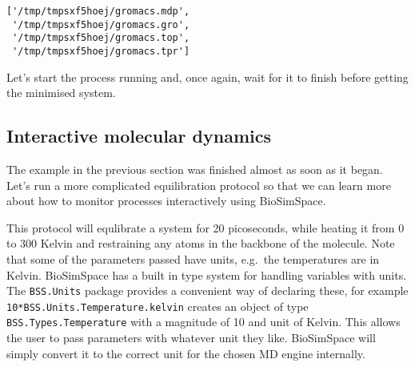 \begin{Shaded}
\begin{Highlighting}[]
\end{Highlighting}
\end{Shaded}

\begin{verbatim}
['/tmp/tmpsxf5hoej/gromacs.mdp',
 '/tmp/tmpsxf5hoej/gromacs.gro',
 '/tmp/tmpsxf5hoej/gromacs.top',
 '/tmp/tmpsxf5hoej/gromacs.tpr']
\end{verbatim}

Let's start the process running and, once again, wait for it to finish
before getting the minimised system.

\begin{Shaded}
\begin{Highlighting}[]
\OperatorTok{=}\OperatorTok{=}\NormalTok{)}
\end{Highlighting}
\end{Shaded}

\hypertarget{interactive-molecular-dynamics}{%
\subsection{Interactive molecular
dynamics}\label{interactive-molecular-dynamics}}

The example in the previous section was finished almost as soon as it
began. Let's run a more complicated equilibration protocol so that we
can learn more about how to monitor processes interactively using
BioSimSpace.

\begin{Shaded}
\begin{Highlighting}[]
\OperatorTok{=}\OperatorTok{=}\OperatorTok{*}
\OperatorTok{=}\OperatorTok{*}
\OperatorTok{=}\OperatorTok{*}
\OperatorTok{=}\NormalTok{)}
\end{Highlighting}
\end{Shaded}

This protocol will equlibrate a system for 20 picoseconds, while heating
it from 0 to 300 Kelvin and restraining any atoms in the backbone of the
molecule. Note that some of the parameters passed have units, e.g.~the
temperatures are in Kelvin. BioSimSpace has a built in type system for
handling variables with units. The \texttt{BSS.Units} package provides a
convenient way of declaring these, for example
\texttt{10*BSS.Units.Temperature.kelvin} creates an object of type
\texttt{BSS.Types.Temperature} with a magnitude of 10 and unit of
Kelvin. This allows the user to pass parameters with whatever unit they
like. BioSimSpace will simply convert it to the correct unit for the
chosen MD engine internally.

